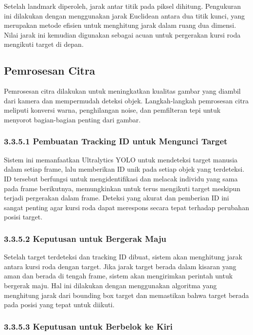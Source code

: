 Setelah landmark diperoleh, jarak antar titik pada piksel dihitung. Pengukuran ini dilakukan dengan menggunakan jarak Euclidean antara dua titik kunci, yang merupakan metode efisien untuk menghitung jarak dalam ruang dua dimensi. Nilai jarak ini kemudian digunakan sebagai acuan untuk pergerakan kursi roda mengikuti target di depan.

\subsection{Pemrosesan Citra}
\label{subsec:pemrosesan_citra}

Pemrosesan citra dilakukan untuk meningkatkan kualitas gambar yang diambil dari kamera dan mempermudah deteksi objek. Langkah-langkah pemrosesan citra meliputi konversi warna, penghilangan noise, dan pemfilteran tepi untuk menyorot bagian-bagian penting dari gambar.

\subsubsection{3.3.5.1 Pembuatan Tracking ID untuk Mengunci Target}
\label{subsubsec:tracking_id}

Sistem ini memanfaatkan Ultralytics YOLO untuk mendeteksi target manusia dalam setiap frame, lalu memberikan ID unik pada setiap objek yang terdeteksi. ID tersebut berfungsi untuk mengidentifikasi dan melacak individu yang sama pada frame berikutnya, memungkinkan untuk terus mengikuti target meskipun terjadi pergerakan dalam frame. Deteksi yang akurat dan pemberian ID ini sangat penting agar kursi roda dapat merespons secara tepat terhadap perubahan posisi target.

\subsubsection{3.3.5.2 Keputusan untuk Bergerak Maju}
\label{subsubsec:keputusan_bergerak_maju}

Setelah target terdeteksi dan tracking ID dibuat, sistem akan menghitung jarak antara kursi roda dengan target. Jika jarak target berada dalam kisaran yang aman dan berada di tengah frame, sistem akan mengirimkan perintah untuk bergerak maju. Hal ini dilakukan dengan menggunakan algoritma yang menghitung jarak dari bounding box target dan memastikan bahwa target berada pada posisi yang tepat untuk diikuti.

\subsubsection{3.3.5.3 Keputusan untuk Berbelok ke Kiri}
\label{subsubsec:keputusan_belok_kiri}

